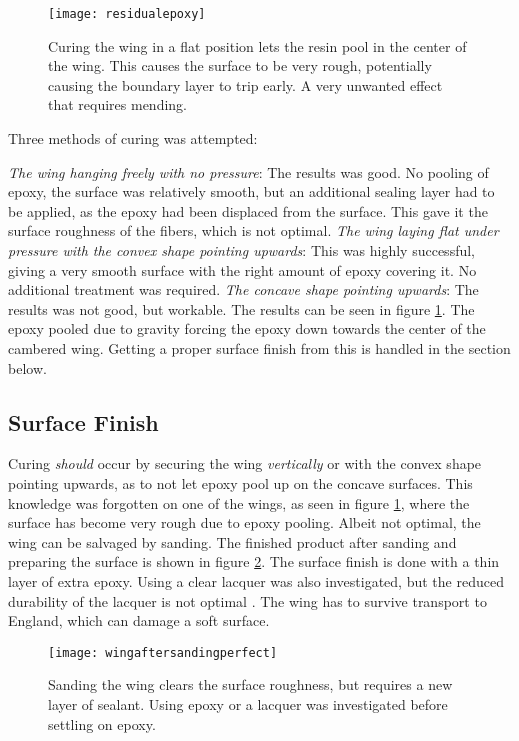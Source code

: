     \begin{figure}
      \texttt{[image: residualepoxy]}
      \caption{Curing the wing in a flat position lets the resin pool in the center of the wing. This causes the surface to be very rough, potentially causing the boundary layer to trip early. A very unwanted effect that requires mending.}
      \label{fig:roughsurface}
    \end{figure}

    Three methods of curing was attempted:

    \emph{The wing hanging freely with no pressure}: The results was good. No pooling of epoxy, the surface was relatively smooth, but an additional sealing layer had to be applied, as the epoxy had been displaced from the surface. This gave it the surface roughness of the fibers, which is not optimal.\newline
    \emph{The wing laying flat under pressure with the convex shape pointing upwards}: This was highly successful, giving a very smooth surface with the right amount of epoxy covering it. No additional treatment was required.\newline
    \emph{The concave shape pointing upwards}: The results was not good, but workable. The results can be seen in figure \ref{fig:roughsurface}. The epoxy pooled due to gravity forcing the epoxy down towards the center of the cambered wing. Getting a proper surface finish from this is handled in the section below.

  \subsection{Surface Finish}

    Curing \emph{should} occur by securing the wing \emph{vertically} or with the convex shape pointing upwards, as to not let epoxy pool up on the concave surfaces. This knowledge was forgotten on one of the wings, as seen in figure \ref{fig:roughsurface}, where the surface has become very rough due to epoxy pooling. Albeit not optimal, the wing can be salvaged by sanding. The finished product after sanding and preparing the surface is shown in figure \ref{fig:wingaftersanding}. The surface finish is done with a thin layer of extra epoxy. Using a clear lacquer was also investigated, but the reduced durability of the lacquer is not optimal \cite{lacquersucks}. The wing has to survive transport to England, which can damage a soft surface.

    \begin{figure}
      \texttt{[image: wingaftersandingperfect]}
      \caption{Sanding the wing clears the surface roughness, but requires a new layer of sealant. Using epoxy or a lacquer was investigated before settling on epoxy.}
      \label{fig:wingaftersanding}
    \end{figure}

